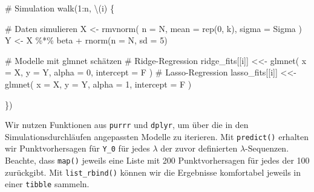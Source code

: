 \documentclass[
  a4paper,
  DIV=11,
  oneside]{scrreprt}
\newenvironment{Shaded}{\begin{snugshade}}{\end{snugshade}}
\newcommand{\AttributeTok}[1]{\textcolor[rgb]{0.40,0.45,0.13}{#1}}
\newcommand{\CommentTok}[1]{\textcolor[rgb]{0.37,0.37,0.37}{#1}}
\newcommand{\DecValTok}[1]{\textcolor[rgb]{0.68,0.00,0.00}{#1}}
\newcommand{\FunctionTok}[1]{\textcolor[rgb]{0.28,0.35,0.67}{#1}}
\newcommand{\NormalTok}[1]{\textcolor[rgb]{0.00,0.23,0.31}{#1}}
\newcommand{\OtherTok}[1]{\textcolor[rgb]{0.00,0.23,0.31}{#1}}
\newcommand{\SpecialCharTok}[1]{\textcolor[rgb]{0.37,0.37,0.37}{#1}}
\begin{document}
\begin{Shaded}
\begin{Highlighting}[]
\CommentTok{\# Simulation}
\FunctionTok{walk}\NormalTok{(}\DecValTok{1}\SpecialCharTok{:}\NormalTok{n, \textbackslash{}(i) \{}
  
  \CommentTok{\# Daten simulieren}
\NormalTok{  X }\OtherTok{\textless{}{-}} \FunctionTok{rmvnorm}\NormalTok{(}
    \AttributeTok{n =}\NormalTok{ N, }
    \AttributeTok{mean =} \FunctionTok{rep}\NormalTok{(}\DecValTok{0}\NormalTok{, k), }
    \AttributeTok{sigma =}\NormalTok{ Sigma}
\NormalTok{  )}
\NormalTok{  Y }\OtherTok{\textless{}{-}}\NormalTok{ X }\SpecialCharTok{\%*\%}\NormalTok{ beta }\SpecialCharTok{+} \FunctionTok{rnorm}\NormalTok{(}\AttributeTok{n =}\NormalTok{ N, }\AttributeTok{sd =} \DecValTok{5}\NormalTok{)}
  
  \CommentTok{\# Modelle mit glmnet schätzen}
  \CommentTok{\# Ridge{-}Regression}
\NormalTok{  ridge\_fits[[i]] }\OtherTok{\textless{}\textless{}{-}} \FunctionTok{glmnet}\NormalTok{(}
    \AttributeTok{x =}\NormalTok{ X, }
    \AttributeTok{y =}\NormalTok{ Y, }
    \AttributeTok{alpha =} \DecValTok{0}\NormalTok{, }
    \AttributeTok{intercept =}\NormalTok{ F}
\NormalTok{  )}
  \CommentTok{\# Lasso{-}Regression}
\NormalTok{  lasso\_fits[[i]] }\OtherTok{\textless{}\textless{}{-}} \FunctionTok{glmnet}\NormalTok{(}
    \AttributeTok{x =}\NormalTok{ X, }
    \AttributeTok{y =}\NormalTok{ Y, }
    \AttributeTok{alpha =} \DecValTok{1}\NormalTok{, }
    \AttributeTok{intercept =}\NormalTok{ F}
\NormalTok{  )}
  
\NormalTok{\})}
\end{Highlighting}
\end{Shaded}

Wir nutzen Funktionen aus \texttt{purrr} und \texttt{dplyr}, um über die
in den Simulationsdurchläufen angepassten Modelle zu iterieren. Mit
\texttt{predict()} erhalten wir Punktvorhersagen für \texttt{Y\_0} für
jedes \(\lambda\) der zuvor definierten \(\lambda\)-Sequenzen. Beachte,
dass \texttt{map()} jeweils eine Liste mit 200 Punktvorhersagen für
jedes der 100 zurückgibt. Mit \texttt{list\_rbind()} können wir die
Ergebnisse komfortabel jeweils in einer \texttt{tibble} sammeln.
\end{document}

